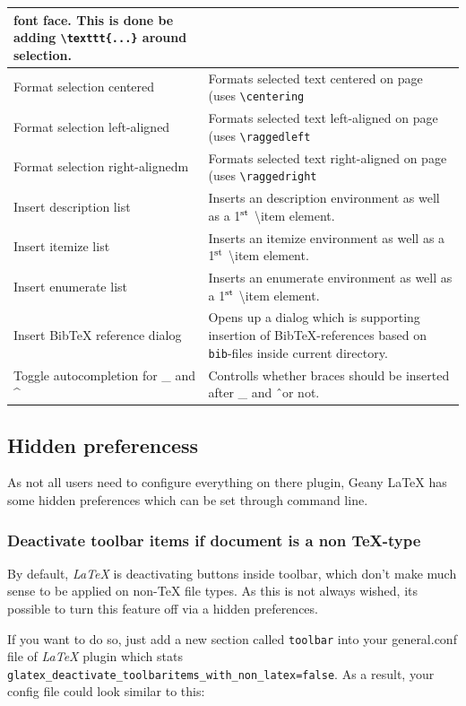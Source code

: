 \documentclass[%
paper=a4,%
fontsize=11pt,%
twoside=false,%
DIV18,%
headsepline,%
plainheadsepline,%
footsepline,%
plainfootsepline,%
bibliography=totoc,%
listof=totoc,%
BCOR10mm,%
parskip=half,%
openany,%
]{scrreprt}
\newcommand{\up}[1]{\ensuremath{^\textrm{\scriptsize#1}}}
\begin{document}
\begin{table}[H]
\begin{tabular}{l|p{9cm}}
font face. This is done be adding \texttt{\textbackslash texttt\{...\}} around
selection.\\\hline
Format selection centered & Formats selected text centered on page (uses \texttt{\textbackslash{}centering} \\\hline
Format selection left-aligned & Formats selected text left-aligned on page (uses \texttt{\textbackslash{}raggedleft} \\\hline
Format selection right-alignedm & Formats selected text right-aligned on page (uses \texttt{\textbackslash{}raggedright}\\\hline
Insert description list & Inserts an description environment as well as a 1\up{st} \textbackslash{}item element.\\\hline
Insert itemize list & Inserts an itemize environment as well as a 1\up{st} \textbackslash{}item element.\\\hline
Insert enumerate list & Inserts an enumerate environment as well as a 1\up{st} \textbackslash{}item element.\\\hline
Insert BibTeX reference dialog & Opens up a dialog which is supporting insertion of BibTeX-references based on \texttt{bib}-files inside current directory.\\\hline
Toggle autocompletion for \_ and \^ & Controlls whether braces should be inserted after \_ and \^ \ or not.
\end{tabular}
\end{table}


\subsection{Hidden preferencess}
\label{sec:hidden_preferences}
As not all users need to configure everything on there plugin, Geany
\LaTeX{} has some hidden preferences which can be set through
command line.

\subsubsection{Deactivate toolbar items if document is a non \TeX-type}
\label{deactivate_toolbaritems_with_non_latex}
By default, \textit{LaTeX} is deactivating buttons inside toolbar, which
don't make much sense to be applied on non-\TeX{} file types. As
this is not always wished, its possible to turn this feature off
via a hidden preferences.

If you want to do so, just add a new section called \texttt{toolbar}
into your general.conf file of \textit{LaTeX} plugin which stats
\texttt{glatex\_deactivate\_toolbaritems\_with\_non\_latex=false}.
As a result, your config file could look similar to this:
\end{document}
